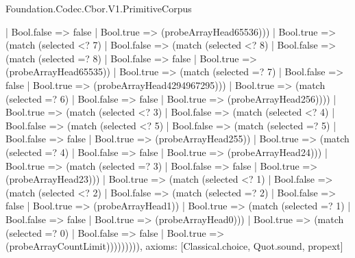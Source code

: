\begin{lexlean}{Foundation.Codec.Cbor.V1.PrimitiveCorpus}
\begin{semanticmodule}
{                  | Bool.false => false
                  | Bool.true => (probeArrayHead65536)))
              | Bool.true => (match (selected <? 7)
                | Bool.false => (match (selected <? 8)
                  | Bool.false => (match (selected =? 8)
                    | Bool.false => false
                    | Bool.true => (probeArrayHead65535))
                  | Bool.true => (match (selected =? 7)
                    | Bool.false => false
                    | Bool.true => (probeArrayHead4294967295)))
                | Bool.true => (match (selected =? 6)
                  | Bool.false => false
                  | Bool.true => (probeArrayHead256))))
            | Bool.true => (match (selected <? 3)
              | Bool.false => (match (selected <? 4)
                | Bool.false => (match (selected <? 5)
                  | Bool.false => (match (selected =? 5)
                    | Bool.false => false
                    | Bool.true => (probeArrayHead255))
                  | Bool.true => (match (selected =? 4)
                    | Bool.false => false
                    | Bool.true => (probeArrayHead24)))
                | Bool.true => (match (selected =? 3)
                  | Bool.false => false
                  | Bool.true => (probeArrayHead23)))
              | Bool.true => (match (selected <? 1)
                | Bool.false => (match (selected <? 2)
                  | Bool.false => (match (selected =? 2)
                    | Bool.false => false
                    | Bool.true => (probeArrayHead1))
                  | Bool.true => (match (selected =? 1)
                    | Bool.false => false
                    | Bool.true => (probeArrayHead0)))
                | Bool.true => (match (selected =? 0)
                  | Bool.false => false
                  | Bool.true => (probeArrayCountLimit))))))))),
  axioms: [Classical.choice, Quot.sound, propext]
}


\end{semanticmodule}
\end{lexlean}

